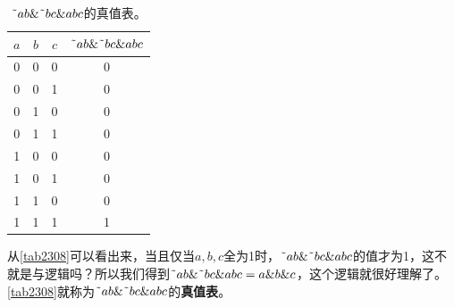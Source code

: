 \begin{table}[!ht]
\centering
\begin{tabular}{|c|c|c||c|}
\hline
$a$&$b$&$c$&$\textrm{\~{}}ab\&\textrm{\~{}}bc\&abc$\\\hline
0&0&0&0\\\hline
0&0&1&0\\\hline
0&1&0&0\\\hline
0&1&1&0\\\hline
1&0&0&0\\\hline
1&0&1&0\\\hline
1&1&0&0\\\hline
1&1&1&1\\\hline
\end{tabular}
\caption{$\textrm{\~{}}ab\&\textrm{\~{}}bc\&abc$的真值表。}\label{tab2308}
\end{table}

从\autoref{tab2308}可以看出来，当且仅当$a,b,c$全为1时，$\textrm{\~{}}ab\&\textrm{\~{}}bc\&abc$的值才为1，这不就是与逻辑吗？所以我们得到$\textrm{\~{}}ab\&\textrm{\~{}}bc\&abc=a\&b\&c$，这个逻辑就很好理解了。\autoref{tab2308}就称为$\textrm{\~{}}ab\&\textrm{\~{}}bc\&abc$的\textbf{真值表}。

